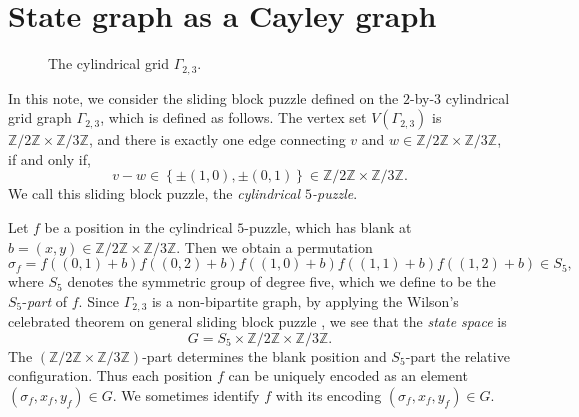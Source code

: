 \documentclass[lualatex,11pt]{article}
\begin{document}
\section{State graph as a Cayley graph}

\begin{figure}[t]
\centering
{}
\caption{The cylindrical grid $\Gamma_{2,3}$. }
\end{figure}

In this note, we consider the sliding block puzzle defined
on the $2$-by-$3$ cylindrical grid graph $\Gamma_{2,3}$, which
is defined as follows.
The vertex set $V(\Gamma_{2,3})$ is ${\mathbb Z}/2{\mathbb Z}\times {\mathbb Z}/3{\mathbb Z}$,
and there is exactly one edge connecting $v$ and $w\in {\mathbb Z}/2{\mathbb Z}\times {\mathbb Z}/3{\mathbb Z}$,
if and only if,
\[
 v-w \in \left\{\pm(1,0), \pm(0,1)\right\} \in {\mathbb Z}/2{\mathbb Z}\times {\mathbb Z}/3{\mathbb Z}.
\]
We call this sliding block puzzle, the {\em cylindrical $5$-puzzle}.

Let $f$ be a position in the cylindrical $5$-puzzle,
which has blank  at $b=(x,y)\in {\mathbb Z}/2{\mathbb Z}\times {\mathbb Z}/3{\mathbb Z}$.
Then we obtain a permutation
\[
\sigma_f = 
 f((0,1)+b) 
 f((0,2)+b) 
 f((1,0)+b) 
 f((1,1)+b) 
 f((1,2)+b) \in S_{5},
\]
where $S_5$ denotes the symmetric group of degree five,
which we define to be the $S_5$-{\em part} of $f$.
Since $\Gamma_{2,3}$ is a non-bipartite graph,
by applying the Wilson's celebrated theorem on general
sliding block puzzle \cite{wilson},
we see that the {\em state space} is
\[
 G=S_5\times{\mathbb Z}/2{\mathbb Z}\times{\mathbb Z}/3{\mathbb Z}.
\]
The $\left({\mathbb Z}/2{\mathbb Z}\times{\mathbb Z}/3{\mathbb Z}\right)$-part
determines the blank position
and $S_5$-part the relative configuration.
Thus each position $f$ can be uniquely encoded as an
element $(\sigma_f, x_f, y_f)\in G$.
We sometimes identify $f$ with its encoding $(\sigma_f, x_f, y_f)\in G$.
\end{document}
